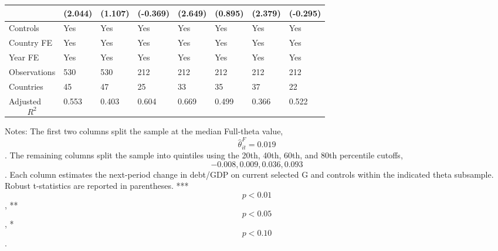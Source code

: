 \begin{table}[H]
\begin{threeparttable}
\begin{tabularx}{\textwidth}{lYYYYYYY}
  & (2.044) & (1.107) & (-0.369) & (2.649) & (0.895) & (2.379) & (-0.295) \\
\midrule
Controls & Yes & Yes & Yes & Yes & Yes & Yes & Yes \\
Country FE & Yes & Yes & Yes & Yes & Yes & Yes & Yes \\
Year FE & Yes & Yes & Yes & Yes & Yes & Yes & Yes \\
Observations & 530 & 530 & 212 & 212 & 212 & 212 & 212 \\
Countries & 45 & 47 & 25 & 33 & 35 & 37 & 22 \\
Adjusted $$R^2$$ & 0.553 & 0.403 & 0.604 & 0.669 & 0.499 & 0.366 & 0.522 \\
\bottomrule
\end{tabularx}
\begin{tablenotes}[flushleft]\footnotesize
\item Notes: The first two columns split the sample at the median Full-theta value, $$\widehat{\theta}^{F}_{it}=0.019$$. The remaining columns split the sample into quintiles using the 20th, 40th, 60th, and 80th percentile cutoffs, $$-0.008, 0.009, 0.036, 0.093$$. Each column estimates the next-period change in debt/GDP on current selected G and controls within the indicated theta subsample. Robust t-statistics are reported in parentheses. *** $$p<0.01$$, ** $$p<0.05$$, * $$p<0.10$$.
\end{tablenotes}
\end{threeparttable}
\end{table}
